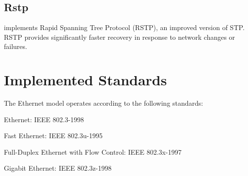 \subsection{Rstp}

 implements Rapid Spanning Tree Protocol (RSTP), an improved
version of STP. RSTP provides significantly faster recovery in response to
network changes or failures.


\section{Implemented Standards}

The Ethernet model operates according to the following standards:

\begin{compactitem}
  \item Ethernet: IEEE 802.3-1998
  \item Fast Ethernet: IEEE 802.3u-1995
  \item Full-Duplex Ethernet with Flow Control: IEEE 802.3x-1997
  \item Gigabit Ethernet: IEEE 802.3z-1998
\end{compactitem}

